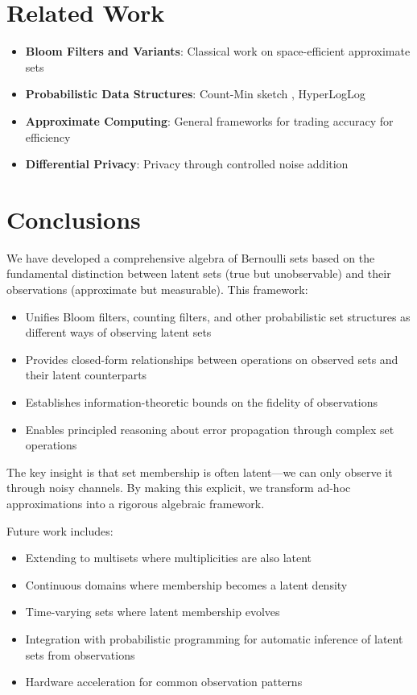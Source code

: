 \documentclass[11pt,final,hidelinks]{article}
\begin{document}
\section{Related Work}

\begin{itemize}
    \item \textbf{Bloom Filters and Variants}: Classical work on space-efficient approximate sets \cite{bloom1970,fan2000,fan2014}
    \item \textbf{Probabilistic Data Structures}: Count-Min sketch \cite{cormode2005}, HyperLogLog \cite{flajolet2007}
    \item \textbf{Approximate Computing}: General frameworks for trading accuracy for efficiency \cite{sampson2011}
    \item \textbf{Differential Privacy}: Privacy through controlled noise addition \cite{dwork2006}
\end{itemize}

\section{Conclusions}

We have developed a comprehensive algebra of Bernoulli sets based on the fundamental distinction between latent sets (true but unobservable) and their observations (approximate but measurable). This framework:
\begin{itemize}
    \item Unifies Bloom filters, counting filters, and other probabilistic set structures as different ways of observing latent sets
    \item Provides closed-form relationships between operations on observed sets and their latent counterparts
    \item Establishes information-theoretic bounds on the fidelity of observations
    \item Enables principled reasoning about error propagation through complex set operations
\end{itemize}

The key insight is that set membership is often latent—we can only observe it through noisy channels. By making this explicit, we transform ad-hoc approximations into a rigorous algebraic framework.

Future work includes:
\begin{itemize}
    \item Extending to multisets where multiplicities are also latent
    \item Continuous domains where membership becomes a latent density
    \item Time-varying sets where latent membership evolves
    \item Integration with probabilistic programming for automatic inference of latent sets from observations
    \item Hardware acceleration for common observation patterns
\end{itemize}


\end{document}
